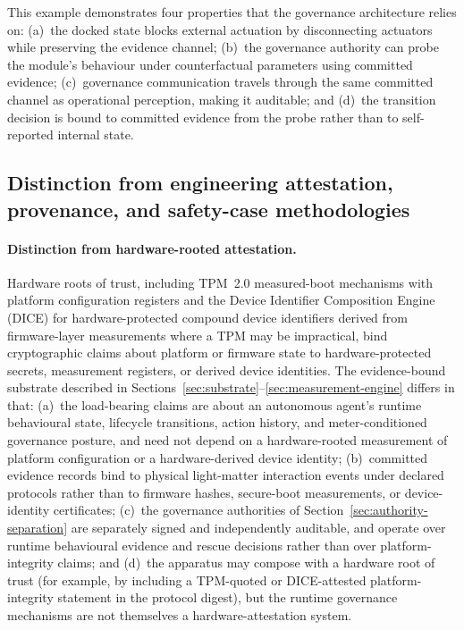 \documentclass[a4paper,12pt]{article}
\begin{document}
This example demonstrates four properties that the governance
architecture relies on: (a)~the docked state blocks
external actuation by disconnecting actuators while preserving the evidence channel; (b)~the
governance authority can probe the module's behaviour under
counterfactual parameters using committed evidence; (c)~governance
communication travels through the same committed channel as
operational perception, making it auditable; and (d)~the transition
decision is bound to committed evidence from the probe rather than to
self-reported internal state.

\subsection{Distinction from engineering attestation, provenance,
  and safety-case methodologies}
\label{sec:distinction-engineering}


\paragraph{Distinction from hardware-rooted attestation.}
Hardware roots of trust, including TPM~2.0 measured-boot mechanisms
with platform configuration registers and the Device Identifier
Composition Engine (DICE) for hardware-protected compound device
identifiers derived from firmware-layer measurements where a TPM
may be impractical, bind cryptographic claims about platform or
firmware state to hardware-protected secrets, measurement registers,
or derived device identities. The evidence-bound substrate described
in Sections~\ref{sec:substrate}--\ref{sec:measurement-engine}
differs in that: (a)~the load-bearing claims are about an autonomous
agent's runtime behavioural state, lifecycle transitions, action
history, and meter-conditioned governance posture, and need not
depend on a hardware-rooted measurement of platform configuration
or a hardware-derived device identity; (b)~committed evidence
records bind to physical light-matter interaction events under
declared protocols rather than to firmware hashes, secure-boot
measurements, or device-identity certificates; (c)~the governance
authorities of Section~\ref{sec:authority-separation} are
separately signed and independently auditable, and operate over
runtime behavioural evidence and rescue decisions rather than
over platform-integrity claims; and (d)~the apparatus may compose
with a hardware root of trust (for example, by including a
TPM-quoted or DICE-attested platform-integrity statement in the
protocol digest), but the runtime governance mechanisms are not
themselves a hardware-attestation system.
\end{document}
